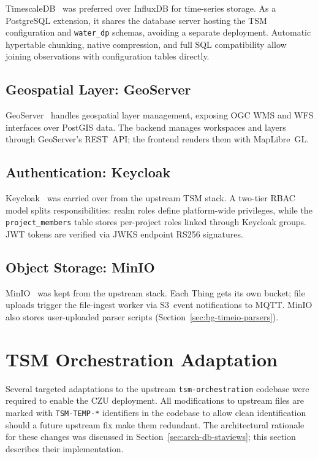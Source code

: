 TimescaleDB~\cite{timescaledb-ref} was preferred over InfluxDB for time-series storage. As a
PostgreSQL extension, it shares the database server hosting the TSM configuration and
\texttt{water\_dp} schemas, avoiding a separate deployment. Automatic hypertable
chunking, native compression, and full SQL compatibility allow joining observations with
configuration tables directly.

\subsection{Geospatial Layer: GeoServer}
\label{sec:impl-tech-geoserver}

GeoServer~\cite{geoserver-ref} handles geospatial layer management, exposing OGC WMS and WFS
interfaces over PostGIS data. The backend manages workspaces and layers through GeoServer's
REST~API; the frontend renders them with MapLibre~GL.

\subsection{Authentication: Keycloak}
\label{sec:impl-tech-keycloak}

Keycloak~\cite{keycloak-ref} was carried over from the upstream TSM stack. A two-tier RBAC
model splits responsibilities: realm roles define platform-wide privileges, while the
\texttt{project\_members} table stores per-project roles linked through Keycloak groups.
JWT tokens are verified via JWKS endpoint RS256 signatures.

\subsection{Object Storage: MinIO}
\label{sec:impl-tech-minio}

MinIO~\cite{minio-ref} was kept from the upstream stack. Each Thing gets its own bucket;
file uploads trigger the file-ingest worker via S3~event notifications to MQTT. MinIO also
stores user-uploaded parser scripts (Section~\ref{sec:bg-timeio-parsers}).

\section{TSM Orchestration Adaptation}
\label{sec:impl-tsm}

Several targeted adaptations to the upstream \texttt{tsm-orchestration} codebase were required to enable the CZU deployment.
All modifications to upstream files are marked with \texttt{TSM-TEMP-*} identifiers in the codebase to allow clean
identification should a future upstream fix make them redundant. The architectural rationale for these changes
was discussed in Section~\ref{sec:arch-db-staviews}; this section describes their implementation.


